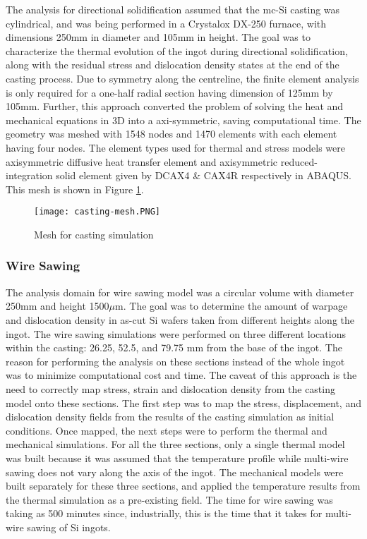 The analysis for directional solidification assumed that the mc-Si casting was cylindrical, and was being performed in a Crystalox DX-250 furnace, with dimensions 250mm in diameter and 105mm in height. The goal was to characterize the thermal evolution of the ingot during directional solidification, along with the residual stress and dislocation density states at the end of the casting process. Due to symmetry along the centreline, the finite element analysis is only required for a one-half radial section having dimension of 125mm by 105mm. Further, this approach converted the problem of solving the heat and mechanical equations in 3D into a axi-symmetric, saving computational time. The geometry was meshed with 1548 nodes and 1470 elements with each element having four nodes. The element types used for thermal and stress models were axisymmetric diffusive heat transfer element and axisymmetric reduced-integration solid element given by DCAX4 \& CAX4R respectively in ABAQUS. This mesh is shown in Figure \ref{fig:casting-mesh}.

\begin{figure}[h]
    \centering
    \texttt{[image: casting-mesh.PNG]}
    \caption{Mesh for casting simulation}
    \label{fig:casting-mesh}
\end{figure}

\subsubsection{Wire Sawing}
The analysis domain for wire sawing model was a circular volume with diameter 250mm and height 1500$\mu$m. The goal was to determine the amount of warpage and dislocation density in as-cut Si wafers taken from different heights along the ingot. The wire sawing simulations were performed on three different locations within the casting: 26.25, 52.5, and 79.75 mm from the base of the ingot. The reason for performing the analysis on these sections instead of the whole ingot was to minimize computational cost and time. The caveat of this approach is the need to correctly map stress, strain and dislocation density from the casting model onto these sections. The first step was to map the stress, displacement, and dislocation density fields from the results of the casting simulation as initial conditions. Once mapped, the next steps were to perform the thermal and mechanical simulations. For all the three sections, only a single thermal model was built because it was assumed that the temperature profile while multi-wire sawing does not vary along the axis of the ingot. The mechanical models were built separately for these three sections, and applied the temperature results from the thermal simulation as a pre-existing field. The time for wire sawing was taking as 500 minutes since, industrially, this is the time that it takes for multi-wire sawing of Si ingots.  

